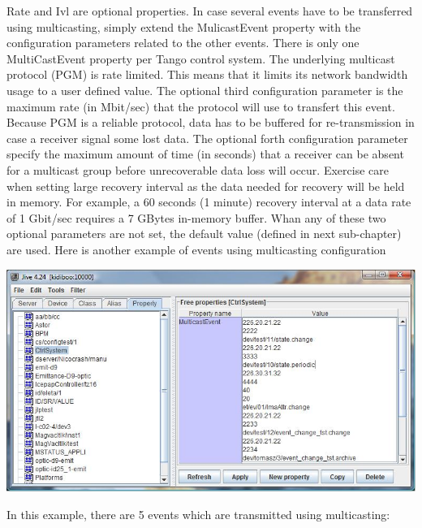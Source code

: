Rate and Ivl are optional properties. In
case several events have to be transferred using multicasting, simply
extend the MulicastEvent property with the configuration parameters
related to the other events. There is only one MultiCastEvent property
per Tango control system. The underlying multicast protocol (PGM)
is rate limited. This means that it limits its network bandwidth usage
to a user defined value. The optional third configuration parameter
is the maximum rate (in Mbit/sec) that the protocol will use to transfert
this event. Because PGM is a reliable protocol, data has to be buffered
for re-transmission in case a receiver signal some lost data. The
optional forth configuration parameter specify the maximum amount
of time (in seconds) that a receiver can be absent for a multicast
group before unrecoverable data loss will occur. Exercise care when
setting large recovery interval as the data needed for recovery will
be held in memory. For example, a 60 seconds (1 minute) recovery interval
at a data rate of 1 Gbit/sec requires a 7 GBytes in-memory buffer.
Whan any of these two optional parameters are not set, the default
value (defined in next sub-chapter) are used. Here is another example
of events using multicasting configuration\begin{center}\includegraphics[scale=0.7]{advanced/jive_sophis}\end{center}
In this example, there are 5 events which are transmitted using multicasting:
